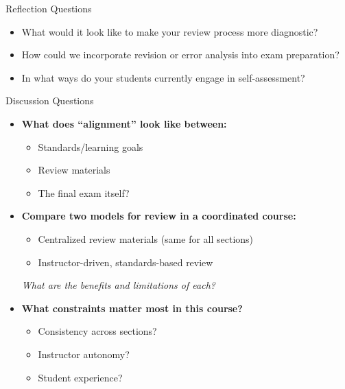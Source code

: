 \documentclass[dvipsnames]{beamer}
\begin{document}
\begin{frame}{Reflection Questions}
\begin{itemize}
    
    \item What would it look like to make your review process more diagnostic?
    
    \item How could we incorporate revision or error analysis into exam preparation? 
    
    \item In what ways do your students currently engage in self-assessment?

\end{itemize}
\end{frame}

\begin{frame}{Discussion Questions }
\begin{itemize}

\item \textbf{What does “alignment” look like between:}
\begin{itemize}
    \item Standards/learning goals
    \item Review materials
    \item The final exam itself?
\end{itemize}

\vspace{0.4cm}

\item \textbf{Compare two models for review in a coordinated course:}
\begin{itemize}
    \item Centralized review materials (same for all sections)
    \item Instructor-driven, standards-based review
\end{itemize}
\textit{What are the benefits and limitations of each?}

\vspace{0.4cm}


\item \textbf{What constraints matter most in this course?}
\begin{itemize}
    \item Consistency across sections?
    \item Instructor autonomy?
    \item Student experience?
\end{itemize}

\end{itemize}
\end{frame}
\end{document}
